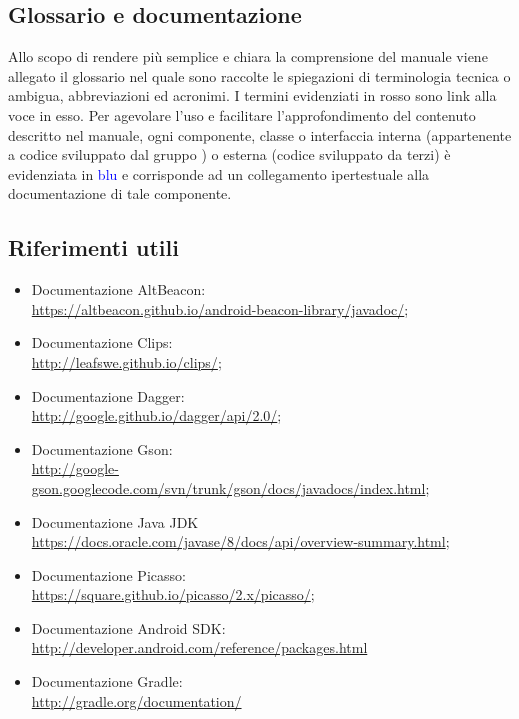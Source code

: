 \documentclass[../ManualeSviluppatore.tex]{subfiles}
\begin{document}
	\subsection{Glossario e documentazione}
		Allo scopo di rendere più semplice e chiara la comprensione del manuale
viene allegato il glossario nel quale sono raccolte le spiegazioni di
terminologia tecnica o ambigua, abbreviazioni ed acronimi. I termini evidenziati in \textcolor{myred}{rosso} sono link alla voce in esso.
		Per agevolare l'uso e facilitare l'approfondimento del contenuto descritto nel manuale, ogni componente, classe o interfaccia interna (appartenente a codice sviluppato dal gruppo \leaf) o esterna (codice sviluppato da terzi) è evidenziata in \textcolor{blue}{blu} e corrisponde ad un collegamento ipertestuale alla documentazione di tale componente.
	
	
	\subsection{Riferimenti utili}
		\begin{itemize}
			\item Documentazione \gls{AltBeacon}: \\ \url{https://altbeacon.github.io/android-beacon-library/javadoc/};
			\item Documentazione Clips: \\ \url{http://leafswe.github.io/clips/};
			\item Documentazione Dagger: \\ \url{http://google.github.io/dagger/api/2.0/};
			\item Documentazione Gson: \\ \url{http://google-gson.googlecode.com/svn/trunk/gson/docs/javadocs/index.html};
			\item Documentazione \gls{Java} JDK \\ \url{https://docs.oracle.com/javase/8/docs/api/overview-summary.html};
			\item Documentazione Picasso: \\ \url{https://square.github.io/picasso/2.x/picasso/};
			\item Documentazione \gls{Android} SDK: \\ \url{http://developer.android.com/reference/packages.html}

			\item Documentazione Gradle: \\ \url{http://gradle.org/documentation/}			

		\end{itemize}
\end{document}
